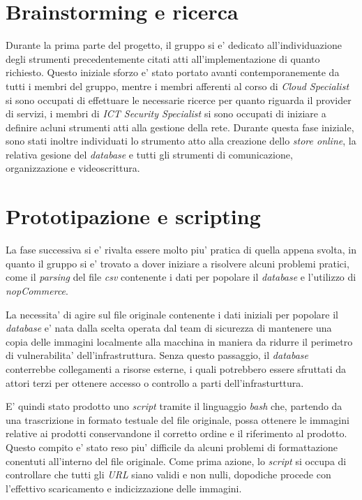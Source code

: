 \documentclass[a4paper]{report}
\begin{document}
	\section{Brainstorming e ricerca} \label{brainstorming_e_ricerca}
		Durante la prima parte del progetto, il gruppo si e' dedicato all'individuazione degli strumenti precedentemente
		citati atti all'implementazione di quanto richiesto. Questo iniziale sforzo e' stato portato avanti
		contemporanemente da tutti i membri del gruppo, mentre i membri afferenti al corso di \emph{Cloud Specialist} si
		sono occupati di effettuare le necessarie ricerce per quanto riguarda il provider di servizi, i membri di
		\emph{ICT Security Specialist} si sono occupati di iniziare a definire acluni strumenti atti alla gestione della
		rete.
		Durante questa fase iniziale, sono stati inoltre individuati lo strumento atto alla creazione dello \emph{store
		online}, la relativa gesione del \emph{database} e tutti gli strumenti di comunicazione, organizzazione e
		videoscrittura.
	\section{Prototipazione e scripting} \label{prototipazione_e_scripting}
		La fase successiva si e' rivalta essere molto piu' pratica di quella appena svolta, in quanto il gruppo si e'
		trovato a dover iniziare a risolvere alcuni problemi pratici, come il \emph{parsing} del file \emph{csv}
		contenente i dati per popolare il \emph{database} e l'utilizzo di \emph{nopCommerce}.

		La necessita' di agire sul file originale contenente i dati iniziali per popolare il \emph{database} e' nata
		dalla scelta operata dal team di sicurezza di mantenere una copia delle immagini localmente alla macchina in
		maniera da ridurre il perimetro di vulnerabilita' dell'infrastruttura. Senza questo passaggio, il
		\emph{database} conterrebbe collegamenti a risorse esterne, i quali potrebbero essere sfruttati da attori
		terzi per ottenere accesso o controllo a parti dell'infrasturttura.

		E' quindi stato prodotto uno \emph{script} tramite  il linguaggio \emph{bash} che, partendo da una trascrizione
		in formato testuale del file originale, possa ottenere le immagini relative ai prodotti conservandone il
		corretto ordine e il riferimento al prodotto. Questo compito e' stato reso piu' difficile da alcuni problemi di
		formattazione conentuti all'interno del file originale. Come prima azione, lo \emph{script} si occupa di
		controllare che tutti gli \emph{URL} siano validi e non nulli, dopodiche procede con l'effettivo scaricamento e
		indicizzazione delle immagini.
\end{document}
